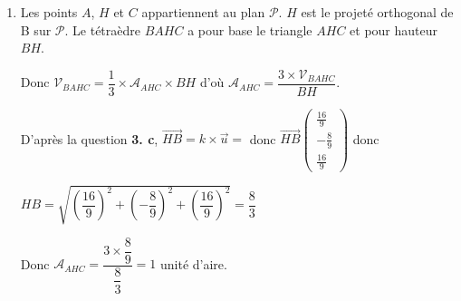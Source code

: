 \documentclass[10pt]{article}
\providecommand{\vect}[1]{\overrightarrow{#1}}
\begin{document}
\begin{enumerate}
\begin{enumerate}
Or les points $A$ et $H$ appartiennent au plan $\mathcal{P}$ normal à la droite $\mathcal{D}$, donc tout vecteur de $\mathcal{P}$ est orthogonal à tout vecteur de $\mathcal{D}$ donc $\vect{AH}\perp \vect{u}$ donc $\vect{AH}.\vect{u}=0$.

Donc $\vect{AB}.\vect{u}=\vect{HB}.\vect{u} = k \times \vect{u}.\vect{u}=k~\vect{u}^2=k~\lVert\vect{u}\rVert^2$ donc $k=\dfrac{\vect{AB}.\vect{u}}{\lVert\vect{u}\rVert^2}$.
	\item On a \(\overrightarrow{u}\begin{pmatrix}2\\-1\\2\end{pmatrix}\) donc $\lVert\vect{u}\rVert=\sqrt{2^2+(-1)^2+2^2}=\sqrt{9}=3$ et $\vect{AB}.\vect{u}=-8$ donc 
	
$k=\dfrac{-8}{3^2}=-\dfrac{8}{9}$.

Donc en posant $H(x~;~y~;~z)$ et $B(-1~;~3~;~0)$ alors \(\overrightarrow{HB}\begin{pmatrix}- 1 - x\\3 - y\\- z\end{pmatrix}\).

De plus $\vect{HB}=k\times \vect{u}=-\dfrac{8}{9}\times \vect{u}$ donc 	$\left\{\begin{array}{l c l}- 1 - x&=&-\dfrac{8}{9}\times 2\\3 - y &=& -\dfrac{8}{9}\times (- 1)\\-z&=&-\dfrac{8}{9}\times 2 \end{array}\right.$

Donc $x=\dfrac{16}{9}-1=\dfrac{7}{9}$ , $y=3-\dfrac{8}{9}=\dfrac{19}{9}$ et $z=\dfrac{16}{9}$. On retrouve les coordonnées du point $H$.
\end{enumerate}
		\item Les points $A$, $H$ et $C$ appartiennent au plan $\mathcal{P}$. $H$ est le projeté orthogonal de B sur  $\mathcal{P}$. Le tétraèdre $BAHC$ a pour base le triangle $AHC$ et pour hauteur $BH$.

Donc $\mathcal{V}_{BAHC}=\dfrac{1}{3}\times \mathcal{A}_{AHC}\times BH$ d'où $\mathcal{A}_{AHC}=\dfrac{3\times \mathcal{V}_{BAHC}}{BH}$.

D'après la question \textbf{3. c}, $\vect{HB}=k\times \vect{u}=$ donc \(\overrightarrow{HB}\begin{pmatrix}\frac{16}{9}\\-\frac{8}{9}\\\frac{16}{9}\end{pmatrix}\) donc

$HB=\sqrt{\left(\dfrac{16}{9}\right)^2+\left(-\dfrac{8}{9}\right)^2+\left(\dfrac{16}{9}\right)^2} = \dfrac{8}{3}$

Donc  $\mathcal{A}_{AHC}=\dfrac{3\times \dfrac{8}{9}}{\dfrac{8}{3}}=1$ unité d'aire.
\end{enumerate}

\bigskip
\end{document}
